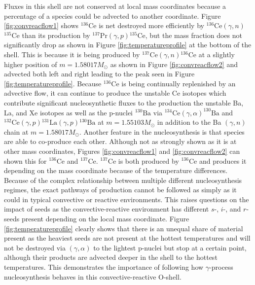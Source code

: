 Fluxes in this shell are not conserved at local mass coordinates because a percentage of a species could be advected to another coordinate.
Figure \ref{fig:convreacflow1} shows $^{136}\mathrm{Ce}$ is net destroyed more efficiently by $^{136}\mathrm{Ce}(\gamma,n)$$^{135}\mathrm{Ce}$ than its production by $^{137}\mathrm{Pr}(\gamma,p)$$^{135}\mathrm{Ce}$, but the mass fraction does not significantly drop as shown in Figure \ref{fig:temperatureprofile} at the bottom of the shell.
This is because it is being produced by $^{137}\mathrm{Ce}(\gamma,n)$$^{136}\mathrm{Ce}$ at a slightly higher position of $m=1.58017M_\odot$ as shown in Figure \ref{fig:convreacflow2} and advected both left and right leading to the peak seen in Figure \ref{fig:temperatureprofile}.
Because $^{136}\mathrm{Ce}$ is being continually replenished by an advective flow, it can continue to produce the unstable Ce isotopes which contribute significant nucleosynthetic fluxes to the production the unstable Ba, La, and Xe isotopes as well as the p-nuclei $^{130}\mathrm{Ba}$ via $^{134}\mathrm{Ce}(\gamma,\alpha)^{130}\mathrm{Ba}$ and $^{132}\mathrm{Ce}(\gamma,p)$$^{131}\mathrm{La}(\gamma,p)$$^{130}\mathrm{Ba}$ at $m=1.55103M_\odot$ in addition to the Ba $(\gamma,n)$ chain at $m=1.58017M_\odot$.
Another feature in the nucleosynthesis is that species are able to co-produce each other.
Although not as strongly shown as it is at other mass coordinates, Figures \ref{fig:convreacflow1} and \ref{fig:convreacflow2} can shown this for $^{136}\mathrm{Ce}$ and $^{137}\mathrm{Ce}$.
$^{137}\mathrm{Ce}$ is both produced by $^{136}\mathrm{Ce}$ and produces it depending on the mass coordinate because of the temperature differences.
Because of the complex relationship between multiple different nucleosynthesis regimes, the exact pathways of production cannot be followed as simply as it could in typical convective or reactive environments.
This raises questions on the impact of seeds as the convective-reactive environment has different $s$-, $i$-, and $r$-seeds present depending on the local mass coordinate.
Figure \ref{fig:temperatureprofile} clearly shows that there is an unequal share of material present as the heaviest seeds are not present at the hottest temperatures and will not be destroyed via $(\gamma,\alpha)$ to the lightest p-nuclei but stop at a certain point, although their products are advected deeper in the shell to the hottest temperatures.
This demonstrates the importance of following how $\gamma$-process nucleosynthesis behaves in this convective-reactive O-shell.

